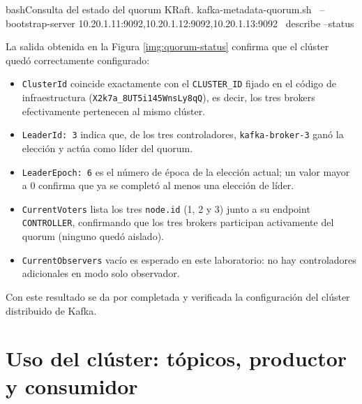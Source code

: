 		\begin{sourcecode}[\label{codigo-quorum-status}]{bash}{Consulta del estado del quorum KRaft.}
kafka-metadata-quorum.sh \
    --bootstrap-server 10.20.1.11:9092,10.20.1.12:9092,10.20.1.13:9092 \
    describe --status
		\end{sourcecode}


		La salida obtenida en la Figura \ref{img:quorum-status} confirma que el clúster quedó correctamente configurado:

		\begin{itemize}
			\item \texttt{ClusterId} coincide exactamente con el \texttt{CLUSTER\_ID} fijado en el código de infraestructura (\texttt{X2k7a\_8UT5i145WnsLy8qQ}), es decir, los tres brokers efectivamente pertenecen al mismo clúster.
			\item \texttt{LeaderId: 3} indica que, de los tres controladores, \texttt{kafka-broker-3} ganó la elección y actúa como líder del quorum.
			\item \texttt{LeaderEpoch: 6} es el número de época de la elección actual; un valor mayor a 0 confirma que ya se completó al menos una elección de líder.
			\item \texttt{CurrentVoters} lista los tres \texttt{node.id} (1, 2 y 3) junto a su endpoint \texttt{CONTROLLER}, confirmando que los tres brokers participan activamente del quorum (ninguno quedó aislado).
			\item \texttt{CurrentObservers} vacío es esperado en este laboratorio: no hay controladores adicionales en modo solo observador.
		\end{itemize}

		Con este resultado se da por completada y verificada la configuración del clúster distribuido de Kafka.


\section{Uso del clúster: tópicos, productor y consumidor}

